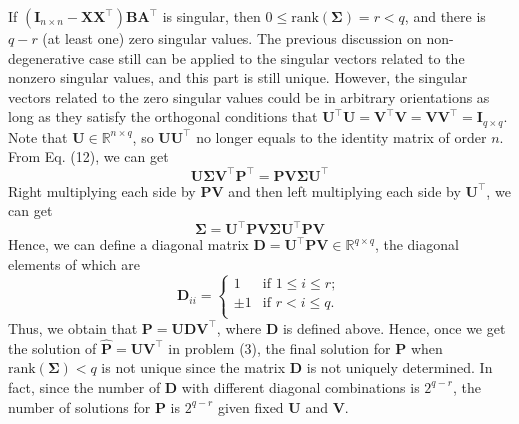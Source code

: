 \documentclass[titlepage,11pt,twoside]{article}
\begin{document}
If $(\mathbf{I}_{n\times n}-\mathbf{X}\mathbf{X}^{\top})\mathbf{B}\mathbf{A}^{\top}$ is singular, then $0\le\text{rank}(\mathbf{\Sigma})=r< q$, and there is $q-r$ (at least one) zero singular values. The previous discussion on non-degenerative case still can be applied to the singular vectors related to the nonzero singular values, and this part is still unique. However, the singular vectors related to the zero singular values could be in arbitrary orientations as long as they satisfy the orthogonal conditions that $\mathbf{U}^{\top}\mathbf{U}=\mathbf{V}^{\top}\mathbf{V}=\mathbf{V}\mathbf{V}^{\top}=\mathbf{I}_{q\times q}$. Note that $\mathbf{U}\in \mathbb{R}^{n\times q}$, so $\mathbf{U}\mathbf{U}^{\top}$ no longer equals to the identity matrix of order $n$. From Eq. (12), we can get 
\begin{equation}
\mathbf{U}\mathbf{\Sigma}\mathbf{V}^{\top}\mathbf{P}^{\top}
=
\mathbf{P}\mathbf{V}\mathbf{\Sigma}\mathbf{U}^{\top}
\end{equation}
Right multiplying each side by $\mathbf{P}\mathbf{V}$ and then left multiplying each side by $\mathbf{U}^{\top}$, we can get  
\begin{equation}
\mathbf{\Sigma}
=
\mathbf{U}^{\top}\mathbf{P}\mathbf{V}\mathbf{\Sigma}\mathbf{U}^{\top}\mathbf{P}\mathbf{V}
\end{equation}
Hence, we can define a diagonal matrix $\mathbf{D}=\mathbf{U}^{\top}\mathbf{P}\mathbf{V}\in\mathbb{R}^{q\times q}$, the diagonal elements of which are 
\begin{displaymath}
\mathbf{D}_{ii}= \left\{ \begin{array}{ll}
1 & \textrm{if $1\le i\le r$};\\
\pm 1 & \textrm{if $r< i \le q$}.\\
\end{array} \right.
\end{displaymath}
Thus, we obtain that $\mathbf{P}=\mathbf{U}\mathbf{D}\mathbf{V}^{\top}$, where $\mathbf{D}$ is defined above. Hence, once we get the solution of $\mathbf{\hat{P}}=\mathbf{U}\mathbf{V}^{\top}$ in problem (3), the final solution for $\mathbf{P}$ when $\text{rank}(\mathbf{\Sigma})<q$ is not unique since the matrix $\mathbf{D}$ is not uniquely determined. In fact, since the number of $\mathbf{D}$ with different diagonal combinations is $2^{q-r}$, the number of solutions for $\mathbf{P}$ is $2^{q-r}$ given fixed $\mathbf{U}$ and $\mathbf{V}$.

\end{document}
